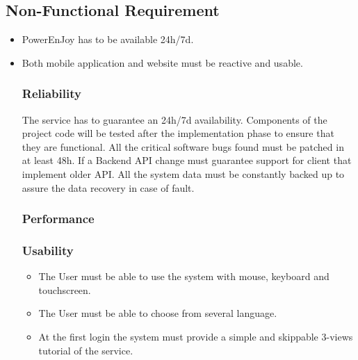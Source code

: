 \documentclass[english]{article}
\begin{document}
\subsection{Non-Functional Requirement}

\begin{itemize}
	\item PowerEnJoy has to be available 24h/7d.
	\item Both mobile application and website must be reactive and usable.
	
\subsubsection{Reliability}%

The service has to guarantee an 24h/7d availability. Components of the project code will be tested after the implementation phase to ensure that they are functional. 
All the critical software bugs found must be patched in at least 48h.
If a Backend API change must guarantee support for client that implement older API.
All the system data must be constantly backed up to assure the data recovery in case of fault.


\subsubsection{Performance}

\subsubsection{Usability}
\begin{itemize}
	\item The User must be able to use the system with mouse, keyboard and touchscreen.
	\item The User must be able to choose from several language.
	\item At the first login the system must provide a simple and skippable 3-views tutorial of the service.
	
\end{itemize}


\end{itemize}
\end{document}
